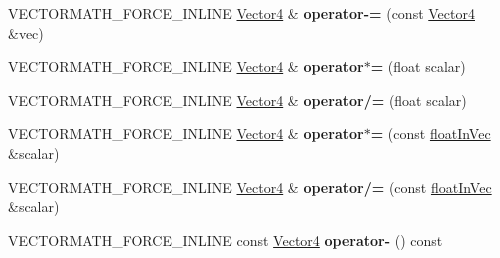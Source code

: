 \begin{DoxyCompactItemize}
\mbox{\label{classVectormath_1_1Aos_1_1Vector4_ab9a663764d89cf57d19fbf93034c1282}} 
V\+E\+C\+T\+O\+R\+M\+A\+T\+H\+\_\+\+F\+O\+R\+C\+E\+\_\+\+I\+N\+L\+I\+NE \hyperlink{classVectormath_1_1Aos_1_1Vector4}{Vector4} \& {\bfseries operator-\/=} (const \hyperlink{classVectormath_1_1Aos_1_1Vector4}{Vector4} \&vec)
\item 
\mbox{\label{classVectormath_1_1Aos_1_1Vector4_ae10f2e976fe6ff7df2e1f233ecdc5149}} 
V\+E\+C\+T\+O\+R\+M\+A\+T\+H\+\_\+\+F\+O\+R\+C\+E\+\_\+\+I\+N\+L\+I\+NE \hyperlink{classVectormath_1_1Aos_1_1Vector4}{Vector4} \& {\bfseries operator$\ast$=} (float scalar)
\item 
\mbox{\label{classVectormath_1_1Aos_1_1Vector4_a2510ee14cac26209bccebe162c975cc9}} 
V\+E\+C\+T\+O\+R\+M\+A\+T\+H\+\_\+\+F\+O\+R\+C\+E\+\_\+\+I\+N\+L\+I\+NE \hyperlink{classVectormath_1_1Aos_1_1Vector4}{Vector4} \& {\bfseries operator/=} (float scalar)
\item 
\mbox{\label{classVectormath_1_1Aos_1_1Vector4_a8b830ec31981acae88a47686b7f3e8e9}} 
V\+E\+C\+T\+O\+R\+M\+A\+T\+H\+\_\+\+F\+O\+R\+C\+E\+\_\+\+I\+N\+L\+I\+NE \hyperlink{classVectormath_1_1Aos_1_1Vector4}{Vector4} \& {\bfseries operator$\ast$=} (const \hyperlink{classVectormath_1_1floatInVec}{float\+In\+Vec} \&scalar)
\item 
\mbox{\label{classVectormath_1_1Aos_1_1Vector4_ad2dea35da6878024b32e1c5b95e1573f}} 
V\+E\+C\+T\+O\+R\+M\+A\+T\+H\+\_\+\+F\+O\+R\+C\+E\+\_\+\+I\+N\+L\+I\+NE \hyperlink{classVectormath_1_1Aos_1_1Vector4}{Vector4} \& {\bfseries operator/=} (const \hyperlink{classVectormath_1_1floatInVec}{float\+In\+Vec} \&scalar)
\item 
\mbox{\label{classVectormath_1_1Aos_1_1Vector4_ad4f6f5e0d65c41bec8a04cfbd280948c}} 
V\+E\+C\+T\+O\+R\+M\+A\+T\+H\+\_\+\+F\+O\+R\+C\+E\+\_\+\+I\+N\+L\+I\+NE const \hyperlink{classVectormath_1_1Aos_1_1Vector4}{Vector4} {\bfseries operator-\/} () const
\end{DoxyCompactItemize}

